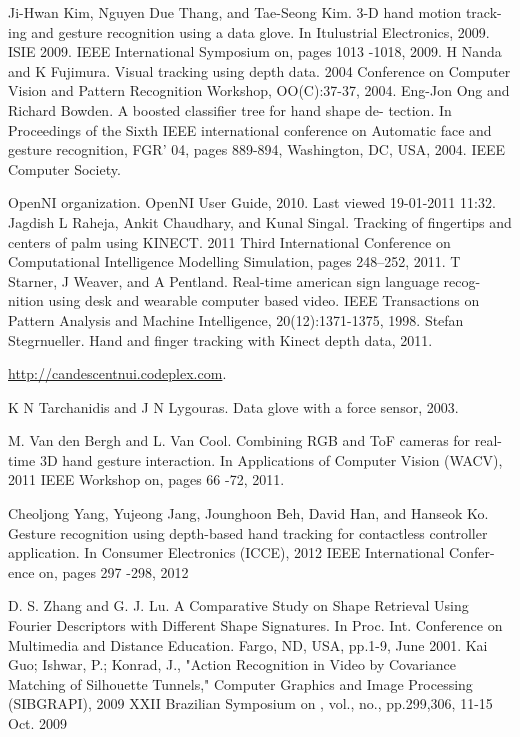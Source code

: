 \documentclass{report}           %
\begin{document}
\begin{thebibliography}{60}
  Ji-Hwan Kim, Nguyen Due Thang, and Tae-Seong Kim. 3-D hand motion track- ing and gesture recognition using a data  glove. In Itulustrial Electronics, 2009. ISIE  2009. IEEE  International  Symposium  on, pages 1013 -1018, 2009.
 H Nanda and K Fujimura.  Visual tracking using depth  data.   2004 Conference on Computer  Vision and Pattern  Recognition Workshop, OO(C):37-37, 2004.
   Eng-Jon Ong and Richard Bowden. A boosted classifier tree for hand shape de- tection.   In Proceedings of the Sixth IEEE international conference on Automatic face  and gesture recognition, FGR'  04, pages 889-894, Washington,  DC, USA,
2004. IEEE Computer  Society.

  OpenNI organization.  OpenNI User Guide, 2010. Last viewed 19-01-2011 11:32. 
 Jagdish   L Raheja,   Ankit  Chaudhary,    and  Kunal   Singal.   Tracking   of fingertips and  centers   of palm  using  KINECT.     2011 Third International  Conference on Computational Intelligence Modelling Simulation, pages  248--252, 2011.
 T Starner,   J  Weaver,  and  A Pentland.    Real-time   american   sign language   recog- nition   using  desk  and  wearable   computer   based  video.   IEEE  Transactions on Pattern  Analysis  and Machine Intelligence, 20(12):1371-1375,    1998.
 Stefan   Stegrnueller.     Hand   and  finger  tracking   with   Kinect   depth   data,   2011.

\url{http://candescentnui.codeplex.com}.

 K N Tarchanidis   and  J  N Lygouras.   Data  glove with  a force sensor,  2003.

   M. Van den  Bergh  and  L. Van Cool.  Combining   RGB  and  ToF  cameras  for real- time  3D hand  gesture  interaction.    In Applications of Computer Vision (WACV),
2011 IEEE  Workshop on, pages  66 -72,  2011.

 Cheoljong   Yang,  Yujeong  Jang,   Jounghoon   Beh,  David  Han,  and  Hanseok  Ko. Gesture   recognition   using  depth-based    hand   tracking   for  contactless   controller application.    In  Consumer Electronics (ICCE), 2012 IEEE International  Confer- ence on, pages  297 -298,  2012

D. S. Zhang and G. J. Lu. A Comparative Study on Shape Retrieval
Using Fourier Descriptors with Different Shape Signatures. In Proc. Int.
Conference on Multimedia and Distance Education. Fargo, ND, USA,
pp.1-9, June 2001. 
Kai Guo; Ishwar, P.; Konrad, J., "Action Recognition in Video by Covariance
Matching of Silhouette Tunnels," Computer Graphics and Image Processing
(SIBGRAPI), 2009 XXII Brazilian Symposium on , vol., no., pp.299,306, 11-15 Oct.
2009 


\end{thebibliography}
\end{document}
